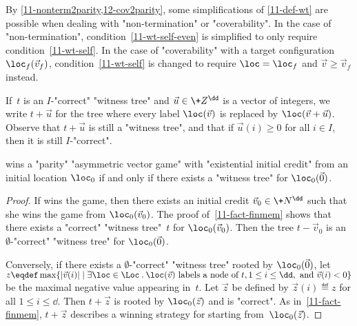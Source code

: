 \begin{remark}\label{11-rk-wt}
  By \cref{11-nonterm2parity,12-cov2parity}, some simplifications of
  \cref{11-def-wt} are possible when dealing with "non-termination" or
  "coverability". In the case of "non-termination",
  condition~\ref{11-wt-self-even} is simplified to only require
  condition~\ref{11-wt-self}.  In the case of "coverability" with a
  target configuration $\loc_f(\vec v_f)$, condition~\ref{11-wt-self}
  is changed to require $\loc=\loc_f$ and $\vec v\geq\vec v_f$
  instead.
\end{remark}

If~$t$ is an $I$-"correct" "witness tree" and $\vec u\in\+Z^\dd$ is a
vector of integers, we write $t+\vec u$ for the tree where
every label $\loc(\vec v)$ is replaced by $\loc(\vec v+\vec u)$.
Observe that $t+\vec u$ is still a "witness tree", and that if $\vec
u(i)\geq 0$ for all $i\in I$, then it is still $I$-"correct".

\begin{lemma}\label{11-lem-wt}
  \Eve wins a "parity" "asymmetric vector game" with "existential
  initial credit" from an initial location $\loc_0$ if and only if
  there exists a "witness tree" for $\loc_0(\vec 0)$.
\end{lemma}
\begin{proof}
  If \Eve wins the game, then there exists an initial credit
  $\vec v_0\in\+N^\dd$ such that she wins the game from
  $\loc_0(\vec v_0)$.  The proof of~\cref{11-fact-finmem} shows that
  there exists a "correct" "witness tree"~$t$ for $\loc_0(\vec v_0)$.
  Then the tree $t-\vec v_0$ is an $\emptyset$-"correct" "witness
  tree" for $\loc_0(\vec 0)$.

  Conversely, if there exists a $\emptyset$-"correct" "witness tree"
  rooted by $\loc_0(\vec 0)$, let
  $z\eqdef\max\{|\vec v(i)|\mid \exists\loc\in\Loc\mathbin.\loc(\vec
  v)\text{ labels a node of }t,1\leq i\leq \dd,\text{ and }\vec v(i)<0\}$
  be the maximal negative value appearing in~$t$.  Let $\vec z$ be
  defined by $\vec z(i)\eqdef z$ for all $1\leq i\leq\dd$.  Then
  $t+\vec z$ is rooted by $\loc_0(\vec z)$ and is "correct".  As
  in~\cref{11-fact-finmem}, $t+\vec z$ describes a winning strategy
  for \Eve starting from~$\loc_0(\vec z)$.
\end{proof}

